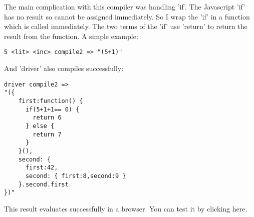 The main complication with this compiler was handling 'if'. The
Javascript 'if' has no result so cannot be assigned immediately. So I
wrap the 'if' in a function which is called immediately. The two terms
of the 'if' use 'return' to return the result from the function. A
simple example:

\begin{verbatim}
5 <lit> <inc> compile2 => "(5+1)"
\end{verbatim}

And 'driver' also compiles successfully:

\begin{verbatim}
driver compile2 => 
"({ 
    first:function() {
      if(5+1+1== 0) {
        return 6
      } else { 
        return 7
      }
    }(),
    second: { 
      first:42,
      second: { first:8,second:9 } 
    }.second.first 
})"
\end{verbatim}

This result evaluates successfully in a browser. You can test it by clicking here.
